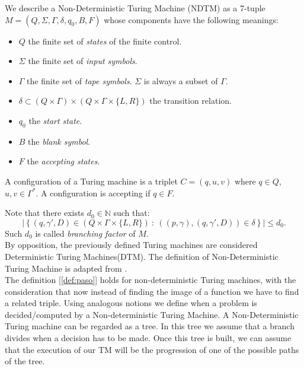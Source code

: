\begin{definition} We describe a Non-Deterministic Turing Machine (NDTM) as a 7-tuple $M=(Q, \Sigma, \Gamma, \delta, q_0, B, F)$ whose components have the following meanings:
  \begin{itemize}
  \item $Q$ the finite set of \emph{states} of the finite control.
  \item $\Sigma$ the finite set of \emph{input symbols}.
  \item $\Gamma$ the finite set of \emph{tape symbols}. $\Sigma$ is always a subset of $\Gamma$.
  \item  $\delta\subset (Q\times \Gamma)\times( Q\times\Gamma\times\{L,R\})$ the transition relation.
  \item $q_0$ the \emph{start state}.
  \item $B$ the \emph{blank symbol}.
  \item $F$ the \emph{accepting states}.
  \end{itemize}

  A configuration of a Turing machine is a triplet $C=(q,u,v)$ where $q\in Q$, $u,v\in \Gamma^*$. A configuration is accepting if $q\in F$.
\end{definition}

Note that there exists $d_0 \in \mathbb{N}$ such that:
  $$ \left| \left \{ (q,\gamma',D) \in  ( Q\times\Gamma\times\{L,R\})\ :\ ( (p,\gamma), (q,\gamma',D) ) \in \delta \right \}\right | \le d_0.$$
  Such $d_0$ is called \emph{branching factor} of $M$.\\

By opposition, the previously defined Turing machines are considered Deterministic Turing Machines(DTM). The definition of Non-Deterministic Turing Machine is adapted from \cite{hopcroft2007introduction}. \\
  
The definition [\ref{def:paso}] holds for non-deterministic Turing machines, with the consideration that now instead of finding the image of a function we have to find a related triple. Using analogous notions we define when a problem is decided/computed by a Non-deterministic Turing Machine. A Non-Deterministic Turing machine can be regarded as a tree. In this tree we assume that a branch divides when a decision has to be made. Once this tree is built, we can assume that the execution of our TM will be the progression of one of the possible paths of the tree.\\

